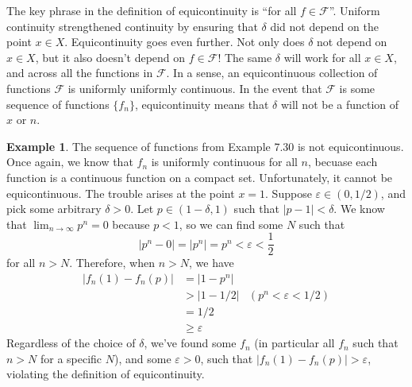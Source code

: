 \documentclass{article}
\newcommand{\abs}[1]{\left\lvert#1\right\rvert}
\theoremstyle{definition}
\newtheorem{example}{Example}[section]
\begin{document}
	The key phrase in the definition of equicontinuity is ``for all $f\in\mathcal F$''. Uniform continuity strengthened continuity by ensuring that $\delta$ did not depend on the point $x\in X$. Equicontinuity goes even further. Not only does $\delta$ not depend on $x\in X$, but it also doesn't depend on $f\in\mathcal F$! The same $\delta$ will work for all $x\in X$, and across all the functions in $\mathcal F$. In a sense, an equicontinuous collection of functions $\mathcal F$ is uniformly uniformly continuous. In the event that $\mathcal F$ is some sequence of functions $\{f_n\}$, equicontinuity means that $\delta$ will not be a function of $x$ or $n$.
	
	\begin{example}
		The sequence of functions from Example 7.30 is not equicontinuous. Once again, we know that $f_n$ is uniformly continuous for all $n$, becuase each function is a continuous function on a compact set. Unfortunately, it cannot be equicontinuous. The trouble arises at the point $x = 1$. Suppose $\varepsilon \in (0,1/2)$, and pick some arbitrary $\delta > 0$. Let $p\in(1-\delta, 1)$ such that $|p - 1| < \delta$. We know that $\lim_{n\to\infty}p^n = 0$ because $p < 1$, so we can find some $N$ such that 
		$$\abs{p^n - 0} = \abs{p^n} = p^n < \varepsilon < \frac{1}{2} $$ for all $n>N$. Therefore, when $n > N$, we have 
		\begin{align*}
			\abs{f_n(1)-f_n(p)} &= \abs{1 - p^n} \\
											& > \abs{1 - 1/2}  & ( p^n < \varepsilon < 1/2)\\
											& = 1/2\\
											& \ge \varepsilon
		\end{align*}
	Regardless of the choice of $\delta$, we've found some $f_n$ (in particular all $f_n$ such that $n > N$ for a specific $N$), and some $\varepsilon > 0$, such that $ \abs{f_n(1)-f_n(p)} > \varepsilon$, violating the definition of equicontinuity.
	\end{example}
\end{document}
